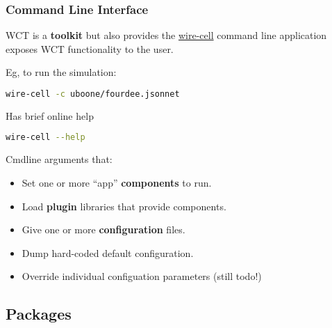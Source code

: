 \documentclass[xcolor=dvipsnames]{beamer}
\begin{document}
\begin{frame}[fragile]
  \frametitle{Command Line Interface}

  \footnotesize
  WCT is a \textbf{toolkit} but also provides the
  \href{https://github.com/WireCell/wire-cell-apps/blob/master/apps/wire-cell.cxx}{wire-cell}
  command line application exposes WCT functionality to the user.

\vfill

  Eg, to run the simulation:

\begin{lstlisting}[language=sh]
wire-cell -c uboone/fourdee.jsonnet
\end{lstlisting}

Has brief online help
\begin{lstlisting}[language=sh]
wire-cell --help
\end{lstlisting}

\vfill Cmdline arguments that:
  \begin{itemize}
  \item Set one or more ``app'' \textbf{components} to run.
  \item Load \textbf{plugin} libraries that provide components.
  \item Give one or more \textbf{configuration} files.
  \item Dump hard-coded default configuration.
  \item Override individual configuation parameters (still todo!)
  \end{itemize}

\end{frame}

\subsection{Packages}

\begin{frame}
  \tableofcontents[
  currentsection,
  currentsubsection,        
  subsectionstyle=show/shaded/hide]
\end{frame}
\end{document}
